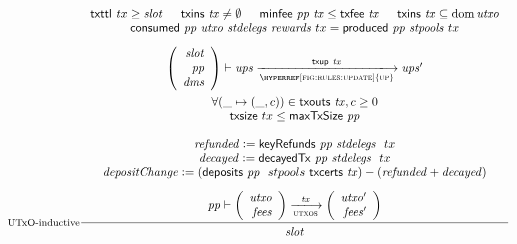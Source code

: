 \begin{figure}[htb]
  \begin{equation}\label{eq:utxo-inductive-shelley}
    \inference[UTxO-inductive]
    { \txttl tx \geq \var{slot}
      & \txins{tx} \neq \emptyset
      & \minfee{pp}{tx} \leq \txfee{tx}
      & \txins{tx} \subseteq \dom \var{utxo}
      \\
      \consumed{pp}{utxo}{stdelegs}{rewards}~{tx} = \produced{pp}{stpools}~{tx}
      \\
      ~
      \\
      {
        \left(
          \begin{array}{r}
            \var{slot} \\
            \var{pp} \\
            \var{dms} \\
          \end{array}
        \right)
      }
      \vdash \var{ups} \trans{\hyperref[fig:rules:update]{up}}{\fun{txup}~\var{tx}} \var{ups'}
      \\
      ~
      \\
      \forall (\_\mapsto (\_, c)) \in \txouts{tx}, c \geq 0
      \\
      \fun{txsize}~{tx}\leq\fun{maxTxSize}~\var{pp}
      \\
      ~
      \\
      \var{refunded} \leteq \keyRefunds{pp}{stdelegs}~{tx}
      \\
      \var{decayed} \leteq \decayedTx{pp}{stdelegs}~{tx}
      \\
      \var{depositChange} \leteq
        (\deposits{pp}~{stpools}~{\txcerts{tx}}) - (\var{refunded} + \var{decayed}) \\~\\
      \var{pp} \vdash
      {
        \left(
          \begin{array}{r}
            \var{utxo} \\
            \var{fees} \\
          \end{array}
        \right)
      }
      \trans{utxos}{\var{tx}}
      {
        \left(
          \begin{array}{r}
            \var{utxo'} \\
            \var{fees'} \\
          \end{array}
        \right)
      }
    }
    {
      \begin{array}{l}
        \var{slot}\\

\end{array}}
\end{equation}
\end{figure}
